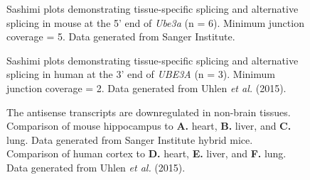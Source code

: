 \begin{figure}
  \centering
  \caption{Sashimi plots demonstrating tissue-specific splicing and alternative splicing in mouse at the 5' end of \textit{Ube3a} (n = 6). Minimum junction coverage = 5. Data generated from Sanger Institute.}
  \label{sashimi tissue specific1}
\end{figure}
\pagebreak
\begin{figure}
  \centering
  \caption{Sashimi plots demonstrating tissue-specific splicing and alternative splicing in human at the 3' end of \textit{UBE3A} (n = 3). Minimum junction coverage = 2. Data generated from Uhlen \textit{et al.} (2015).}
  \label{sashimi tissue specific2}
\end{figure}
\pagebreak
\begin{figure}
  \centering
  \caption{The antisense transcripts are downregulated in non-brain tissues. Comparison of mouse hippocampus to \textbf{A.} heart, \textbf{B.} liver, and \textbf{C.} lung. Data generated from Sanger Institute hybrid mice. Comparison of human cortex to \textbf{D.} heart, \textbf{E.} liver, and \textbf{F.} lung. Data generated from Uhlen \textit{et al.} (2015).}
  \label{tissue logFC}
\end{figure}
\pagebreak

